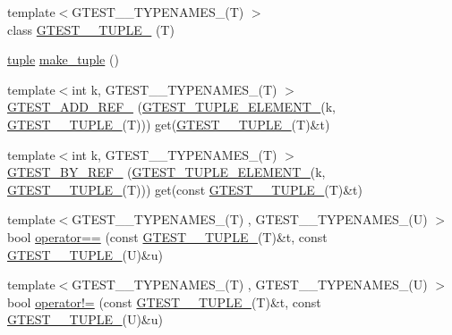 \begin{DoxyCompactItemize}
\item 
{\footnotesize template$<$\-G\-T\-E\-S\-T\-\_\-\_\-\-T\-Y\-P\-E\-N\-A\-M\-E\-S\-\_\-(\-T) $>$ }\\class \hyperlink{namespacestd_1_1tr1_af4a00d1accea9dabe605c9895f33a0a3}{\-G\-T\-E\-S\-T\-\_\-\_\-\-T\-U\-P\-L\-E\-\_\-} (\-T)
\item 
\hyperlink{classstd_1_1tr1_1_1tuple}{tuple} \hyperlink{namespacestd_1_1tr1_a21692ee06c36147458c1f75e7c8a1296}{make\-\_\-tuple} ()
\item 
{\footnotesize template$<$int k, \-G\-T\-E\-S\-T\-\_\-\_\-\-T\-Y\-P\-E\-N\-A\-M\-E\-S\-\_\-(\-T) $>$ }\\\hyperlink{namespacestd_1_1tr1_aae60f16ee244270a28a0374fed590548}{\-G\-T\-E\-S\-T\-\_\-\-A\-D\-D\-\_\-\-R\-E\-F\-\_\-} (\hyperlink{gtest-tuple_8h_a1b7f133d8aa02e0b7afed7b66781eeb7}{\-G\-T\-E\-S\-T\-\_\-\-T\-U\-P\-L\-E\-\_\-\-E\-L\-E\-M\-E\-N\-T\-\_\-}(k, \hyperlink{gtest-tuple_8h_a275e7bcd84299cc44b9c1dba971951c4}{\-G\-T\-E\-S\-T\-\_\-\_\-\-T\-U\-P\-L\-E\-\_\-}(\-T))) get(\hyperlink{gtest-tuple_8h_a275e7bcd84299cc44b9c1dba971951c4}{\-G\-T\-E\-S\-T\-\_\-\_\-\-T\-U\-P\-L\-E\-\_\-}(\-T)\&t)
\item 
{\footnotesize template$<$int k, \-G\-T\-E\-S\-T\-\_\-\_\-\-T\-Y\-P\-E\-N\-A\-M\-E\-S\-\_\-(\-T) $>$ }\\\hyperlink{namespacestd_1_1tr1_a70eef1687deb32579a7162328afc3778}{\-G\-T\-E\-S\-T\-\_\-\-B\-Y\-\_\-\-R\-E\-F\-\_\-} (\hyperlink{gtest-tuple_8h_a1b7f133d8aa02e0b7afed7b66781eeb7}{\-G\-T\-E\-S\-T\-\_\-\-T\-U\-P\-L\-E\-\_\-\-E\-L\-E\-M\-E\-N\-T\-\_\-}(k, \hyperlink{gtest-tuple_8h_a275e7bcd84299cc44b9c1dba971951c4}{\-G\-T\-E\-S\-T\-\_\-\_\-\-T\-U\-P\-L\-E\-\_\-}(\-T))) get(const \hyperlink{gtest-tuple_8h_a275e7bcd84299cc44b9c1dba971951c4}{\-G\-T\-E\-S\-T\-\_\-\_\-\-T\-U\-P\-L\-E\-\_\-}(\-T)\&t)
\item 
{\footnotesize template$<$\-G\-T\-E\-S\-T\-\_\-\_\-\-T\-Y\-P\-E\-N\-A\-M\-E\-S\-\_\-(\-T) , \-G\-T\-E\-S\-T\-\_\-\_\-\-T\-Y\-P\-E\-N\-A\-M\-E\-S\-\_\-(\-U) $>$ }\\bool \hyperlink{namespacestd_1_1tr1_acd4cf6107e05913b8a70108a023952b9}{operator==} (const \hyperlink{gtest-tuple_8h_a275e7bcd84299cc44b9c1dba971951c4}{\-G\-T\-E\-S\-T\-\_\-\_\-\-T\-U\-P\-L\-E\-\_\-}(\-T)\&t, const \hyperlink{gtest-tuple_8h_a275e7bcd84299cc44b9c1dba971951c4}{\-G\-T\-E\-S\-T\-\_\-\_\-\-T\-U\-P\-L\-E\-\_\-}(\-U)\&u)
\item 
{\footnotesize template$<$\-G\-T\-E\-S\-T\-\_\-\_\-\-T\-Y\-P\-E\-N\-A\-M\-E\-S\-\_\-(\-T) , \-G\-T\-E\-S\-T\-\_\-\_\-\-T\-Y\-P\-E\-N\-A\-M\-E\-S\-\_\-(\-U) $>$ }\\bool \hyperlink{namespacestd_1_1tr1_a2e9a8c3a0e08cfe0122e92ef8d77216e}{operator!=} (const \hyperlink{gtest-tuple_8h_a275e7bcd84299cc44b9c1dba971951c4}{\-G\-T\-E\-S\-T\-\_\-\_\-\-T\-U\-P\-L\-E\-\_\-}(\-T)\&t, const \hyperlink{gtest-tuple_8h_a275e7bcd84299cc44b9c1dba971951c4}{\-G\-T\-E\-S\-T\-\_\-\_\-\-T\-U\-P\-L\-E\-\_\-}(\-U)\&u)
\end{DoxyCompactItemize}


